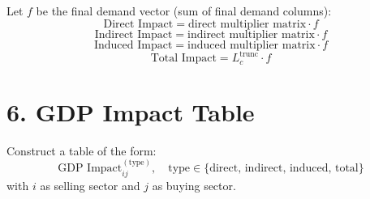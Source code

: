 \documentclass{article}
\begin{document}
Let $f$ be the final demand vector (sum of final demand columns):
\[
\text{Direct Impact} = \text{direct multiplier matrix} \cdot f
\]
\[
\text{Indirect Impact} = \text{indirect multiplier matrix} \cdot f
\]
\[
\text{Induced Impact} = \text{induced multiplier matrix} \cdot f
\]
\[
\text{Total Impact} = L_c^{\text{trunc}} \cdot f
\]

\section*{6. GDP Impact Table}

Construct a table of the form:
\[
\text{GDP Impact}_{ij}^{(\text{type})}, \quad \text{type} \in \{\text{direct, indirect, induced, total}\}
\]
with $i$ as selling sector and $j$ as buying sector.
\end{document}
